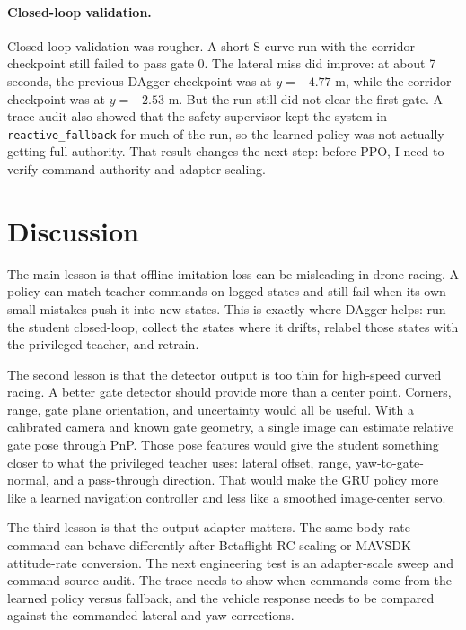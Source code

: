\documentclass[11pt]{article}
\begin{document}
\paragraph{Closed-loop validation.}
Closed-loop validation was rougher. A short S-curve run with the corridor checkpoint still failed to pass gate 0. The lateral miss did improve: at about 7 seconds, the previous DAgger checkpoint was at $y=-4.77$ m, while the corridor checkpoint was at $y=-2.53$ m. But the run still did not clear the first gate. A trace audit also showed that the safety supervisor kept the system in \texttt{reactive\_fallback} for much of the run, so the learned policy was not actually getting full authority. That result changes the next step: before PPO, I need to verify command authority and adapter scaling.

\section{Discussion}

The main lesson is that offline imitation loss can be misleading in drone racing. A policy can match teacher commands on logged states and still fail when its own small mistakes push it into new states. This is exactly where DAgger helps: run the student closed-loop, collect the states where it drifts, relabel those states with the privileged teacher, and retrain.

The second lesson is that the detector output is too thin for high-speed curved racing. A better gate detector should provide more than a center point. Corners, range, gate plane orientation, and uncertainty would all be useful. With a calibrated camera and known gate geometry, a single image can estimate relative gate pose through PnP. Those pose features would give the student something closer to what the privileged teacher uses: lateral offset, range, yaw-to-gate-normal, and a pass-through direction. That would make the GRU policy more like a learned navigation controller and less like a smoothed image-center servo.

The third lesson is that the output adapter matters. The same body-rate command can behave differently after Betaflight RC scaling or MAVSDK attitude-rate conversion. The next engineering test is an adapter-scale sweep and command-source audit. The trace needs to show when commands come from the learned policy versus fallback, and the vehicle response needs to be compared against the commanded lateral and yaw corrections.
\end{document}
